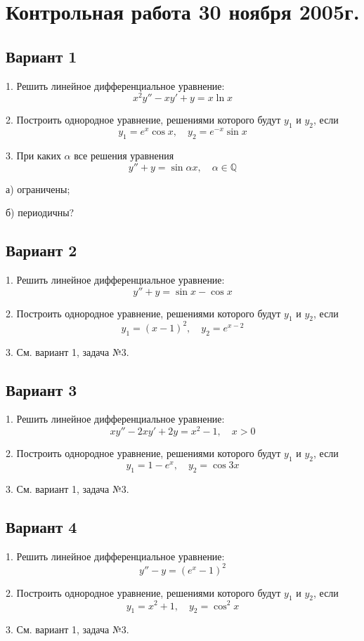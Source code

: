 \documentclass[a4paper]{article}
\newcommand{\No}{№}
\begin{document}
\section{Контрольная работа 30 ноября 2005г.}
\subsection{Вариант 1}

1. Решить линейное дифференциальное уравнение:
$$
x^2y''-xy'+y=x\ln x
$$

2. Построить однородное уравнение, решениями которого будут $y_1$
и $y_2$, если
$$
y_1=e^x\cos x,\quad y_2=e^{-x}\sin x
$$

3. При каких $\alpha$  все решения уравнения
$$
y''+y=\sin \alpha x,\quad \alpha\in \mathbb{Q}
$$

а) ограничены;

б) периодичны?

\subsection{Вариант 2}

1. Решить линейное дифференциальное уравнение:
$$
y''+y=\sin x-\cos x
$$

2. Построить однородное уравнение, решениями которого будут $y_1$
и $y_2$, если
$$
y_1=(x-1)^2,\quad y_2=e^{x-2}
$$

3. См. вариант 1, задача \No 3.

\subsection{Вариант 3}

1. Решить линейное дифференциальное уравнение:
$$
xy''-2xy'+2y=x^2-1,\quad x>0
$$

2. Построить однородное уравнение, решениями которого будут $y_1$
и $y_2$, если
$$
y_1=1-e^x,\quad y_2=\cos 3x
$$

3. См. вариант 1, задача \No 3.

\subsection{Вариант 4}

1. Решить линейное дифференциальное уравнение:
$$
y''-y=(e^x-1)^2
$$

2. Построить однородное уравнение, решениями которого будут $y_1$
и $y_2$, если
$$
y_1=x^2+1,\quad y_2=\cos^2x
$$

3. См. вариант 1, задача \No 3.
\end{document}
